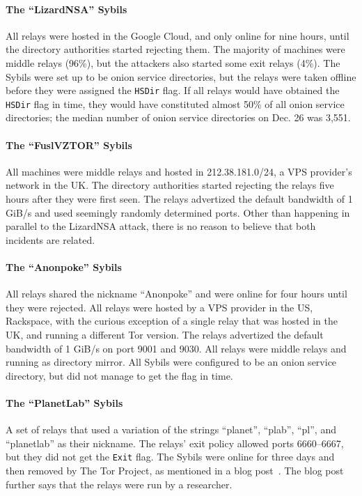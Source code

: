 \paragraph{The ``LizardNSA'' Sybils}
All relays were hosted in the Google Cloud, and only online for nine hours,
until the directory authorities started rejecting them.  The majority of
machines were middle relays (96\%), but the attackers also started some exit
relays (4\%).  The Sybils were set up to be onion service directories, but the
relays were taken offline before they were assigned the \texttt{HSDir} flag.  If
all relays would have obtained the \texttt{HSDir} flag in time, they would have
constituted almost 50\% of all onion service directories; the median number of
onion service directories on Dec. 26 was 3,551.

\paragraph{The ``FuslVZTOR'' Sybils}
All machines were middle relays and hosted in 212.38.181.0/24, a VPS provider's
network in the UK.  The directory authorities started rejecting the relays five
hours after they were first seen.  The relays advertized the default bandwidth
of 1 GiB/s and used seemingly randomly determined ports.  Other than happening
in parallel to the LizardNSA attack, there is no reason to believe that both
incidents are related.

\paragraph{The ``Anonpoke'' Sybils}
All relays shared the nickname ``Anonpoke'' and were online for four hours until
they were rejected.  All relays were hosted by a VPS provider in the US,
Rackspace, with the curious exception of a single relay that was hosted in the
UK, and running a different Tor version.  The relays advertized the default
bandwidth of 1 GiB/s on port 9001 and 9030.  All relays were middle relays and
running as directory mirror.  All Sybils were configured to be an onion service
directory, but did not manage to get the flag in time.

\paragraph{The ``PlanetLab'' Sybils}
A set of relays that used a variation of the strings ``planet'', ``plab'',
``pl'', and ``planetlab'' as their nickname.  The relays' exit policy allowed
ports 6660--6667, but they did not get the \texttt{Exit} flag.  The Sybils were
online for three days and then removed by The Tor Project, as mentioned in a
blog post~\cite{progressreport}.  The blog post further says that the relays
were run by a researcher.

